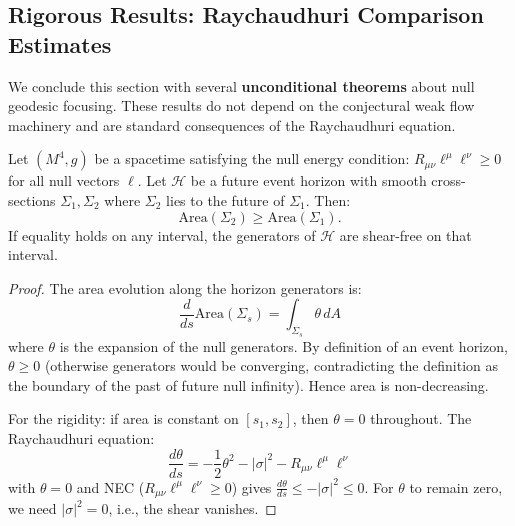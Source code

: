 \subsection{Rigorous Results: Raychaudhuri Comparison Estimates}
\label{subsec:raychaudhuri-comparison}

We conclude this section with several \textbf{unconditional theorems} about null geodesic focusing. These results do not depend on the conjectural weak flow machinery and are standard consequences of the Raychaudhuri equation.

\begin{theorem}
\label{thm:hawking-area-precise}
Let $(M^4, g)$ be a spacetime satisfying the null energy condition: $R_{\mu\nu}\ell^\mu\ell^\nu \geq 0$ for all null vectors $\ell$. Let $\mathcal{H}$ be a future event horizon with smooth cross-sections $\Sigma_1, \Sigma_2$ where $\Sigma_2$ lies to the future of $\Sigma_1$. Then:
\begin{equation}
\mathrm{Area}(\Sigma_2) \geq \mathrm{Area}(\Sigma_1).
\end{equation}
If equality holds on any interval, the generators of $\mathcal{H}$ are shear-free on that interval.
\end{theorem}

\begin{proof}
The area evolution along the horizon generators is:
\begin{equation}
\frac{d}{ds}\mathrm{Area}(\Sigma_s) = \int_{\Sigma_s} \theta \, dA
\end{equation}
where $\theta$ is the expansion of the null generators. By definition of an event horizon, $\theta \geq 0$ (otherwise generators would be converging, contradicting the definition as the boundary of the past of future null infinity). Hence area is non-decreasing.

For the rigidity: if area is constant on $[s_1, s_2]$, then $\theta = 0$ throughout. The Raychaudhuri equation:
\begin{equation}
\frac{d\theta}{ds} = -\frac{1}{2}\theta^2 - |\sigma|^2 - R_{\mu\nu}\ell^\mu\ell^\nu
\end{equation}
with $\theta = 0$ and NEC ($R_{\mu\nu}\ell^\mu\ell^\nu \geq 0$) gives $\frac{d\theta}{ds} \leq -|\sigma|^2 \leq 0$. For $\theta$ to remain zero, we need $|\sigma|^2 = 0$, i.e., the shear vanishes.
\end{proof}

